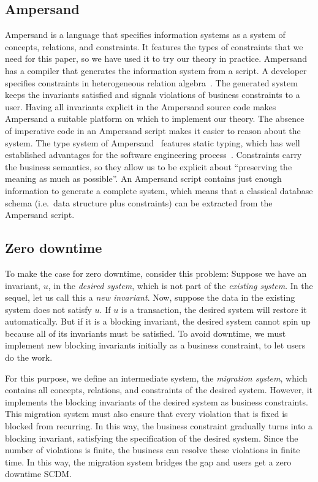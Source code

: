 \documentclass[runningheads]{llncs}
\def\define#1{\label{dfn:#1}{\em #1}\index{#1}}
\begin{document}
\subsection{Ampersand}
   Ampersand is a language that specifies information systems as a system of concepts, relations, and constraints.
   It features the types of constraints that we need for this paper, so we have used it to try our theory in practice.
   Ampersand has a compiler that generates the information system from a script.
   A developer specifies constraints in heterogeneous relation algebra~\cite{Hattensperger1999,Alloy2006}.
   The generated system keeps the invariants satisfied and signals violations of business constraints to a user.
   Having all invariants explicit in the Ampersand source code makes Ampersand a suitable platform on which to implement our theory.
   The absence of imperative code in an Ampersand script makes it easier to reason about the system.
   The type system of Ampersand~\cite{vdWoude2011} features static typing,
   which has well established advantages for the software engineering process~\cite{HanenbergKRTS14,Petersen2014}.
   Constraints carry the business semantics, so they allow us to be explicit about ``preserving the meaning as much as possible''.
   An Ampersand script contains just enough information to generate a complete system,
   which means that a classical database schema (i.e.\ data structure plus constraints) can be extracted from the Ampersand script.

\subsection{Zero downtime}
   To make the case for zero downtime, consider this problem:
   Suppose we have an invariant, $u$, in the {\em desired system}, which is not part of the {\em existing system}.
   In the sequel, let us call this a {\em new invariant}.
   Now, suppose the data in the existing system does not satisfy $u$.
   If $u$ is a transaction, the desired system will restore it automatically.
   But if it is a blocking invariant, the desired system cannot spin up because all of its invariants must be satisfied.
   To avoid downtime, we must implement new blocking invariants initially as a business constraint,
   to let users do the work.

   For this purpose, we define an intermediate system, the \define{migration system},
   which contains all concepts, relations, and constraints of the desired system.
   However, it implements the blocking invariants of the desired system as business constraints.
   This migration system must also ensure that every violation that is fixed is blocked from recurring.
   In this way, the business constraint gradually turns into a blocking invariant, satisfying the specification of the desired system.
   Since the number of violations is finite, the business can resolve these violations in finite time.
   In this way, the migration system bridges the gap and users get a zero downtime SCDM.
\end{document}
